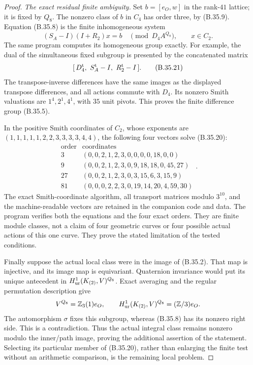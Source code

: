 \begin{proof}
\emph{The exact residual finite ambiguity.}
Set $b=[e_O,w]$ in the rank-$41$ lattice; it is fixed
by $Q_8$. The nonzero class of $b$ in $C_4$ has order
three, by (B.35.9). Equation (B.35.8) is the finite
inhomogeneous system
\[
        (S_A-I)(I+R_2)x=b\quad\pmod{D_4A^{Q_8}},
             \qquad x\in C_2.                               \tag{B.35.20}
\]
The same program computes its homogeneous group exactly.
For example, the dual of the simultaneous fixed subgroup
is presented by the concatenated matrix
\[
                [\,D_4^{\rm t},\ S_A^{\rm t}-I,
                                      \ R_2^{\rm t}-I\,].       \tag{B.35.21}
\]
The transpose-inverse differences have the same images
as the displayed transpose differences, and all actions
commute with $D_4$. Its nonzero Smith valuations are
$1^4,2^1,4^1$, with $35$ unit pivots. This proves the
finite difference group (B.35.5).

In the positive Smith coordinates of $C_2$, whose
exponents are
$(1,1,1,1,1,2,2,3,3,3,3,4,4)$,
the following four vectors solve (B.35.20):
\[
 \begin{array}{c|l}
 \text{order}&\text{coordinates}\\ \hline
 3&(0,0,2,1,2,3,0,0,0,0,18,0,0)\\
 9&(0,0,2,1,2,3,0,9,18,18,0,45,27)\\
 27&(0,0,2,1,2,3,0,3,15,6,3,15,9)\\
 81&(0,0,0,2,2,3,0,19,14,20,4,59,30)
 \end{array}.                                                  \tag{B.35.22}
\]
The exact Smith-coordinate algorithm, all transport
matrices modulo $3^{10}$, and the machine-readable vectors
are retained in the companion code and data.
The program verifies both the equations and the four
exact orders. They are finite module classes, not a
claim of four geometric curves or four possible actual
actions of this one curve. They prove the stated
limitation of the tested conditions.

Finally suppose the actual local class were in the
image of (B.35.2). That map is injective, and its image
map is equivariant. Quaternion invariance would put its
unique antecedent in $H^1_{\rm ur}(K_{(2)},V)^{Q_8}$.
Exact averaging and the regular permutation description
give
\[
 V^{Q_8}=\mathbb Z_3(1)e_O,\qquad
 H^1_{\rm ur}(K_{(2)},V)^{Q_8}
                        =(\mathbb Z/3)e_O.
\]
The automorphism $\sigma$ fixes this subgroup, whereas
(B.35.8) has its nonzero right side. This is a
contradiction. Thus the actual integral class remains
nonzero modulo the inner/path image, proving the
additional assertion of the statement. Selecting its
particular member of (B.35.20), rather than enlarging
the finite test without an arithmetic comparison, is
the remaining local problem.
\end{proof}
